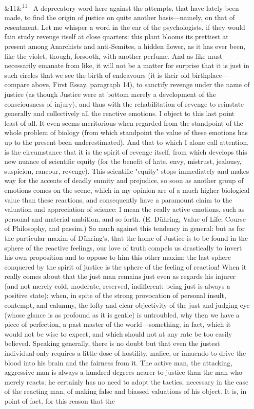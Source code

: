 \documentclass[12pt]{article}
\newcommand{\para}[1][]{\par\noindent\ifx&#1&\else\textsuperscript{\footnotesize #1}~\fi}
\begin{document}
\para[11] A deprecatory word here against the attempts, that have lately been made, to find the origin of justice on quite another basis---namely, on that of resentment. Let me whisper a word in the ear of the psychologists, if they would fain study revenge itself at close quarters: this plant blooms its prettiest at present among Anarchists and anti-Semites, a hidden flower, as it has ever been, like the violet, though, forsooth, with another perfume. And as like must necessarily emanate from like, it will not be a matter for surprise that it is just in such circles that we see the birth of endeavours (it is their old birthplace---compare above, First Essay, paragraph 14), to sanctify revenge under the name of justice (as though Justice were at bottom merely a development of the consciousness of injury), and thus with the rehabilitation of revenge to reinstate generally and collectively all the reactive emotions. I object to this last point least of all. It even seems meritorious when regarded from the standpoint of the whole problem of biology (from which standpoint the value of these emotions has up to the present been underestimated). And that to which I alone call attention, is the circumstance that it is the spirit of revenge itself, from which develops this new nuance of scientific equity (for the benefit of hate, envy, mistrust, jealousy, suspicion, rancour, revenge). This scientific "equity" stops immediately and makes way for the accents of deadly enmity and prejudice, so soon as another group of emotions comes on the scene, which in my opinion are of a much higher biological value than these reactions, and consequently have a paramount claim to the valuation and appreciation of science: I mean the really active emotions, such as personal and material ambition, and so forth. (E. Dühring, Value of Life; Course of Philosophy, and passim.) So much against this tendency in general: but as for the particular maxim of Dühring's, that the home of Justice is to be found in the sphere of the reactive feelings, our love of truth compels us drastically to invert his own proposition and to oppose to him this other maxim: the last sphere conquered by the spirit of justice is the sphere of the feeling of reaction! When it really comes about that the just man remains just even as regards his injurer (and not merely cold, moderate, reserved, indifferent: being just is always a positive state); when, in spite of the strong provocation of personal insult, contempt, and calumny, the lofty and clear objectivity of the just and judging eye (whose glance is as profound as it is gentle) is untroubled, why then we have a piece of perfection, a past master of the world---something, in fact, which it would not be wise to expect, and which should not at any rate be too easily believed. Speaking generally, there is no doubt but that even the justest individual only requires a little dose of hostility, malice, or innuendo to drive the blood into his brain and the fairness from it. The active man, the attacking, aggressive man is always a hundred degrees nearer to justice than the man who merely reacts; he certainly has no need to adopt the tactics, necessary in the case of the reacting man, of making false and biassed valuations of his object. It is, in point of fact, for this reason that the 
\end{document}
